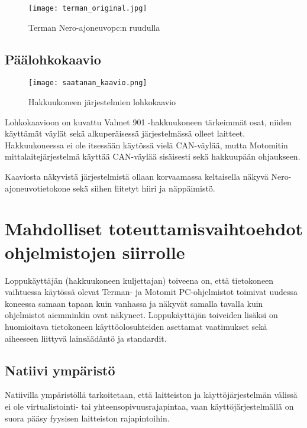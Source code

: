 \begin{figure}[H]
\centering
\texttt{[image: terman\_original.jpg]}
\caption{Terman Nero-ajoneuvopc:n ruudulla}
\end{figure}

\newpage
\section{Päälohkokaavio}

\begin{figure}[H]
\centering
\texttt{[image: saatanan\_kaavio.png]}
\caption{Hakkuukoneen järjestelmien lohkokaavio}
\end{figure}

Lohkokaavioon on kuvattu Valmet 901 -hakkuukoneen tärkeimmät osat, niiden käyttämät väylät sekä alkuperäisessä järjestelmässä olleet laitteet. Hakkuukoneessa ei ole itsessään käytössä vielä CAN-väylää, mutta Motomitin mittalaitejärjestelmä käyttää CAN-väylää sisäisesti sekä hakkuupään ohjaukseen.

Kaaviosta näkyvistä järjestelmistä ollaan korvaamassa keltaisella näkyvä Nero-ajoneuvotietokone sekä siihen liitetyt hiiri ja näppäimistö.

\newpage
\chapter{Mahdolliset toteuttamisvaihtoehdot ohjelmistojen siirrolle}

Loppukäyttäjän (hakkuukoneen kuljettajan) toiveena on, että tietokoneen vaihtuessa käytössä olevat Terman- ja Motomit PC-ohjelmistot toimivat uudessa koneessa samaan tapaan kuin vanhassa ja näkyvät samalla tavalla kuin ohjelmistot aiemminkin ovat näkyneet. Loppukäyttäjän toiveiden lisäksi on huomioitava tietokoneen käyttöolosuhteiden asettamat vaatimukset sekä aiheeseen liittyvä lainsäädäntö ja standardit.

\section{Natiivi ympäristö}

Natiivilla ympäristöllä tarkoitetaan, että laitteiston ja käyttöjärjestelmän välissä ei ole virtualistointi- tai yhteensopivuusrajapintaa, vaan käyttöjärjestelmällä on suora pääsy fyysisen laitteiston rajapintoihin.


